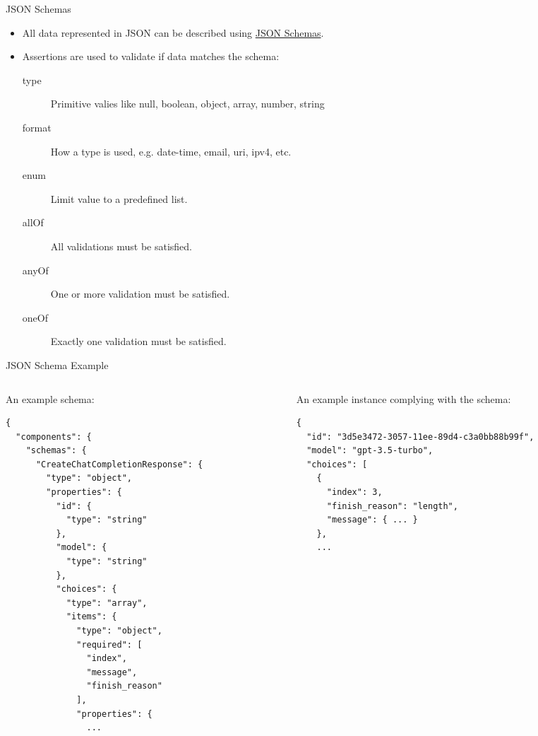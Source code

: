\documentclass[bigger]{beamer}
\begin{document}
\begin{frame}[label={sec:org8368868}]{JSON Schemas}
\begin{itemize}
\item All data represented in JSON can be described using \href{https://datatracker.ietf.org/doc/html/draft-bhutton-json-schema-00}{JSON Schemas}.
\item Assertions are used to validate if data matches the schema:
\begin{description}
\item[{type}] Primitive valies like null, boolean, object, array, number, string
\item[{format}] How a type is used, e.g. date-time, email, uri, ipv4, etc.
\item[{enum}] Limit value to a predefined list.
\item[{allOf}] All validations must be satisfied.
\item[{anyOf}] One or more validation must be satisfied.
\item[{oneOf}] Exactly one validation must be satisfied.
\end{description}
\end{itemize}
\end{frame}

\begin{frame}[label={sec:org9f8fb88},fragile]{JSON Schema Example}
 \begin{columns}
\begin{column}{0.5\columnwidth}
An example schema:

\scriptsize
\begin{verbatim}
{
  "components": {
    "schemas": {
      "CreateChatCompletionResponse": {
        "type": "object",
        "properties": {
          "id": {
            "type": "string"
          },
          "model": {
            "type": "string"
          },
          "choices": {
            "type": "array",
            "items": {
              "type": "object",
              "required": [
                "index",
                "message",
                "finish_reason"
              ],
              "properties": {
                ...
\end{verbatim}
\end{column}

\begin{column}{0.5\columnwidth}
An example instance complying with the schema:

\scriptsize
\begin{verbatim}
{
  "id": "3d5e3472-3057-11ee-89d4-c3a0bb88b99f",
  "model": "gpt-3.5-turbo",
  "choices": [
    {
      "index": 3,
      "finish_reason": "length",
      "message": { ... }
    },
    ...
\end{verbatim}
\end{column}
\end{columns}
\end{frame}
\end{document}
